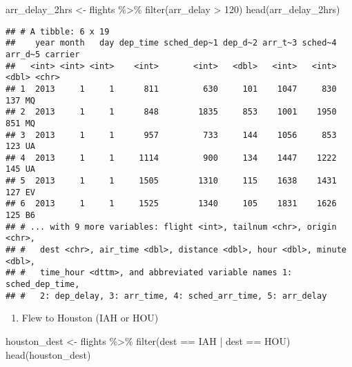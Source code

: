 \documentclass[
]{article}
\newenvironment{Shaded}{\begin{snugshade}}{\end{snugshade}}
\newcommand{\DecValTok}[1]{\textcolor[rgb]{0.00,0.00,0.81}{#1}}
\newcommand{\FunctionTok}[1]{\textcolor[rgb]{0.00,0.00,0.00}{#1}}
\newcommand{\NormalTok}[1]{#1}
\newcommand{\OtherTok}[1]{\textcolor[rgb]{0.56,0.35,0.01}{#1}}
\newcommand{\SpecialCharTok}[1]{\textcolor[rgb]{0.00,0.00,0.00}{#1}}
\newcommand{\StringTok}[1]{\textcolor[rgb]{0.31,0.60,0.02}{#1}}
\providecommand{\tightlist}{%
  \setlength{\itemsep}{0pt}\setlength{\parskip}{0pt}}
\begin{document}
\begin{Shaded}
\begin{Highlighting}[]
\NormalTok{arr\_delay\_2hrs }\OtherTok{\textless{}{-}}\NormalTok{ flights }\SpecialCharTok{\%\textgreater{}\%} \FunctionTok{filter}\NormalTok{(arr\_delay }\SpecialCharTok{\textgreater{}} \DecValTok{120}\NormalTok{)}
\FunctionTok{head}\NormalTok{(arr\_delay\_2hrs)}
\end{Highlighting}
\end{Shaded}

\begin{verbatim}
## # A tibble: 6 x 19
##    year month   day dep_time sched_dep~1 dep_d~2 arr_t~3 sched~4 arr_d~5 carrier
##   <int> <int> <int>    <int>       <int>   <dbl>   <int>   <int>   <dbl> <chr>  
## 1  2013     1     1      811         630     101    1047     830     137 MQ     
## 2  2013     1     1      848        1835     853    1001    1950     851 MQ     
## 3  2013     1     1      957         733     144    1056     853     123 UA     
## 4  2013     1     1     1114         900     134    1447    1222     145 UA     
## 5  2013     1     1     1505        1310     115    1638    1431     127 EV     
## 6  2013     1     1     1525        1340     105    1831    1626     125 B6     
## # ... with 9 more variables: flight <int>, tailnum <chr>, origin <chr>,
## #   dest <chr>, air_time <dbl>, distance <dbl>, hour <dbl>, minute <dbl>,
## #   time_hour <dttm>, and abbreviated variable names 1: sched_dep_time,
## #   2: dep_delay, 3: arr_time, 4: sched_arr_time, 5: arr_delay
\end{verbatim}

\begin{enumerate}
\def\labelenumi{\alph{enumi})}
\setcounter{enumi}{1}
\tightlist
\item
  Flew to Houston (IAH or HOU)
\end{enumerate}

\begin{Shaded}
\begin{Highlighting}[]
\NormalTok{houston\_dest }\OtherTok{\textless{}{-}}\NormalTok{ flights }\SpecialCharTok{\%\textgreater{}\%} \FunctionTok{filter}\NormalTok{(dest }\SpecialCharTok{==} \StringTok{\textquotesingle{}IAH\textquotesingle{}} \SpecialCharTok{|}\NormalTok{ dest }\SpecialCharTok{==} \StringTok{\textquotesingle{}HOU\textquotesingle{}}\NormalTok{)}
\FunctionTok{head}\NormalTok{(houston\_dest)}
\end{Highlighting}
\end{Shaded}
\end{document}
